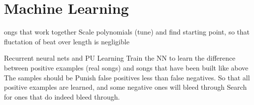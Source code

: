 \section{Machine Learning}

ongs that work together
Scale polynomials (tune) and find starting point,
so that fluctation of beat over length is negligible

Recurrent neural nets and PU Learning
Train the NN to learn the difference between positive examples
(real songs)
and songs that have been built like above
The samples should be
Punish false positives less than false negatives.
So that all positive examples are learned, and some negative ones will bleed through
Search for ones that do indeed bleed through.

